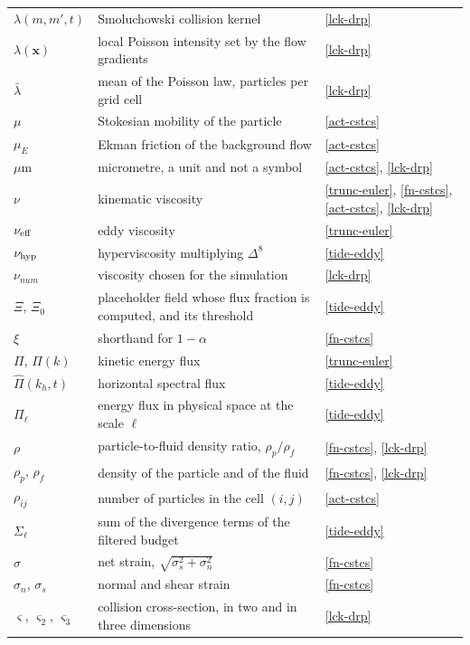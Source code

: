 \begin{longtable}{@{}p{}p{}p{}@{}}
$\lambda(m,m',t)$ & Smoluchowski collision kernel & \ref{lck-drp} \\
$\lambda(\boldsymbol{x})$ & local Poisson intensity set by the flow gradients & \ref{lck-drp} \\
$\bar{\lambda}$ & mean of the Poisson law, particles per grid cell & \ref{lck-drp} \\
\addlinespace
$\mu$ & Stokesian mobility of the particle & \ref{act-cstcs} \\
$\mu_E$ & Ekman friction of the background flow & \ref{act-cstcs} \\
$\mu$m & micrometre, a unit and not a symbol & \ref{act-cstcs}, \ref{lck-drp} \\
\addlinespace
$\nu$ & kinematic viscosity & \ref{trunc-euler}, \ref{fn-cstcs}, \ref{act-cstcs}, \ref{lck-drp} \\
$\nu_{\rm eff}$ & eddy viscosity & \ref{trunc-euler} \\
$\nu_{\rm hyp}$ & hyperviscosity multiplying $\Delta^8$ & \ref{tide-eddy} \\
$\nu_{num}$ & viscosity chosen for the simulation & \ref{lck-drp} \\
\addlinespace
$\varXi$, $\varXi_0$ & placeholder field whose flux fraction is computed, and its threshold & \ref{tide-eddy} \\
$\xi$ & shorthand for $1-\alpha$ & \ref{fn-cstcs} \\
\addlinespace
$\Pi$, $\Pi(k)$ & kinetic energy flux & \ref{trunc-euler} \\
$\widehat{\Pi}(k_h,t)$ & horizontal spectral flux & \ref{tide-eddy} \\
$\Pi_\ell$ & energy flux in physical space at the scale $\ell$ & \ref{tide-eddy} \\
\addlinespace
$\rho$ & particle-to-fluid density ratio, $\rho_p/\rho_f$ & \ref{fn-cstcs}, \ref{lck-drp} \\
$\rho_p$, $\rho_f$ & density of the particle and of the fluid & \ref{fn-cstcs}, \ref{lck-drp} \\
$\rho_{ij}$ & number of particles in the cell $(i,j)$ & \ref{act-cstcs} \\
\addlinespace
$\Sigma_\ell$ & sum of the divergence terms of the filtered budget & \ref{tide-eddy} \\
$\sigma$ & net strain, $\sqrt{\sigma_s^2+\sigma_n^2}$ & \ref{fn-cstcs} \\
$\sigma_n$, $\sigma_s$ & normal and shear strain & \ref{fn-cstcs} \\
$\varsigma$, $\varsigma_2$, $\varsigma_3$ & collision cross-section, in two and in three dimensions & \ref{lck-drp} \\

\end{longtable}
